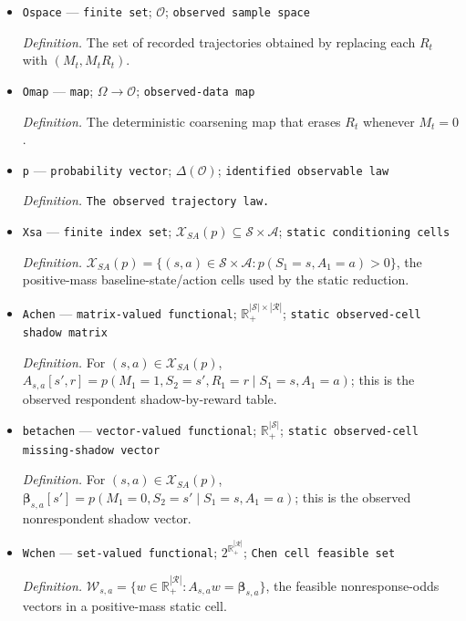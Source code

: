 \documentclass{article}
\begin{document}
\begin{itemize}
  \par\smallskip\noindent\emph{Definition.} The set of complete trajectories \(\omega=(S_1,A_1,R_1,M_1,S_2,\ldots,A_H,R_H,M_H,S_{H+1})\).
  \item \texttt{Ospace} --- \texttt{finite set}; \(\mathcal O\); \texttt{observed sample space}
  \par\smallskip\noindent\emph{Definition.} The set of recorded trajectories obtained by replacing each \(R_t\) with \((M_t,M_tR_t)\).
  \item \texttt{Omap} --- \texttt{map}; \(\Omega\to\mathcal O\); \texttt{observed-\allowbreak{}data map}
  \par\smallskip\noindent\emph{Definition.} The deterministic coarsening map that erases \(R_t\) whenever \(M_t=0\).
  \item \texttt{p} --- \texttt{probability vector}; \(\Delta(\mathcal O)\); \texttt{identified observable law}
  \par\smallskip\noindent\emph{Definition.} \texttt{The observed trajectory law.}
  \item \texttt{Xsa} --- \texttt{finite index set}; \(\mathcal X_{SA}(p)\subseteq\mathcal S\times\mathcal A\); \texttt{static conditioning cells}
  \par\smallskip\noindent\emph{Definition.} \(\mathcal X_{SA}(p)=\{(s,a)\in\mathcal S\times\mathcal A:p(S_1=s,A_1=a)>0\}\), the positive-mass baseline-state/action cells used by the static reduction.
  \item \texttt{Achen} --- \texttt{matrix-\allowbreak{}valued functional}; \(\mathbb R_+^{|\mathcal S|\times|\mathcal R|}\); \texttt{static observed-\allowbreak{}cell shadow matrix}
  \par\smallskip\noindent\emph{Definition.} For \((s,a)\in\mathcal X_{SA}(p)\), \(A_{s,a}[s',r]=p(M_1=1,S_2=s',R_1=r\mid S_1=s,A_1=a)\); this is the observed respondent shadow-by-reward table.
  \item \texttt{betachen} --- \texttt{vector-\allowbreak{}valued functional}; \(\mathbb R_+^{|\mathcal S|}\); \texttt{static observed-\allowbreak{}cell missing-\allowbreak{}shadow vector}
  \par\smallskip\noindent\emph{Definition.} For \((s,a)\in\mathcal X_{SA}(p)\), \(\boldsymbol\beta_{s,a}[s']=p(M_1=0,S_2=s'\mid S_1=s,A_1=a)\); this is the observed nonrespondent shadow vector.
  \item \texttt{Wchen} --- \texttt{set-\allowbreak{}valued functional}; \(2^{\mathbb R_+^{|\mathcal R|}}\); \texttt{Chen cell feasible set}
  \par\smallskip\noindent\emph{Definition.} \(\mathcal W_{s,a}=\{w\in\mathbb R_+^{|\mathcal R|}:A_{s,a}w=\boldsymbol\beta_{s,a}\}\), the feasible nonresponse-odds vectors in a positive-mass static cell.

\end{itemize}
\end{document}
